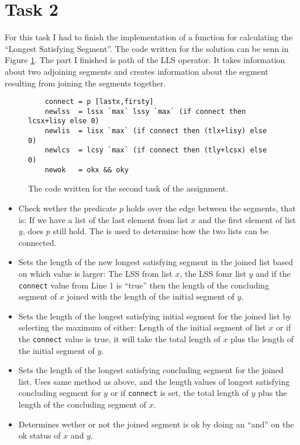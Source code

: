 \section{Task 2}

For this task I had to finish the implementation of a function for calculating
the ``Longest Satisfying Segment''. The code written for the solution can be
senn in Figure \ref{fig:t2code}. The part I finished is path of the LLS
operator. It takes information about two adjoining segments and creates
information about the segment resulting from joining the segments together.

\begin{figure}[ht]
    \begin{lstlisting}
    connect = p [lastx,firsty]
    newlss  = lssx `max` lssy `max` (if connect then lcsx+lisy else 0)
    newlis  = lisx `max` (if connect then (tlx+lisy) else 0)
    newlcs  = lcsy `max` (if connect then (tly+lcsx) else 0)
    newok   = okx && oky
    \end{lstlisting}
    \caption{The code written for the second task of the assignment.}
    \label{fig:t2code}
\end{figure}

\begin{itemize}
    \item[Line 1] Check wether the predicate $p$ holds over the edge between the
    segments, that is: If we have a list of the last element from list $x$ and
    the first element of list $y$, does $p$ still hold. The is used to determine
    how the two lists can be connected.

    \item[Line 2] Sets the length of the new longest satisfying segment in the
    joined list based on which value is larger: The LSS from list $x$, the LSS
    fomr list $y$ and if the \texttt{connect} value from Line 1 is ``true'' then
    the length of the concluding segment of $x$ joined with the length of the
    initial segment of $y$.

    \item[Line 3] Sets the length of the longest satisfying initial segment for
    the joined list by selecting the maximum of either: Length of the initial
    segment of list $x$ or if the \texttt{connect} value is true, it will take
    the total length of $x$ plus the length of the initial segment of $y$.

    \item[Line 4] Sets the length of the longest satisfying concluding segment
    for the joined list. Uses same method as above, and the length values of
    longest satisfying concluding segment for $y$ or if \texttt{connect} is set,
    the total length of $y$ plus the length of the concluding segment of $x$.

    \item[Line 5] Determines wether or not the joined segment is ok by doing an
    ``and'' on the ok status of $x$ and $y$.
\end{itemize}
